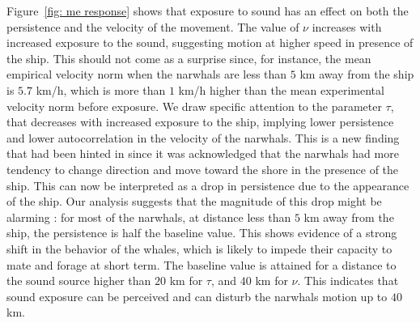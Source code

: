 \documentclass[11pt]{article}
\newcommand {\1}{\mathbb{1}}
\theoremstyle{definition}
\theoremstyle{remark}
\theoremstyle{remark}
\begin{document}
Figure~\ref{fig: me response} shows that exposure to sound has an effect on both the persistence and the velocity of the movement. The value of $\nu$ increases with increased exposure to the sound, suggesting motion at higher speed in presence of the ship. This should not come as a surprise since, for instance, the mean empirical velocity norm when the narwhals are less than $5$ km away from the ship is $5.7$ km/h, which is more than $1$ km/h higher than the mean experimental velocity norm before exposure. We draw specific attention to the parameter $\tau$, that decreases with increased exposure to the ship, implying lower persistence and lower autocorrelation in the velocity of the narwhals. This is a new finding that had been hinted in \cite{heide-jorgensen_behavioral_2021} since it was acknowledged that the narwhals had more tendency to change direction and move toward the shore in the presence of the ship. This can now be interpreted as a drop in persistence due to the appearance of the ship. Our analysis suggests that the magnitude of this drop might be alarming : for most of the narwhals, at distance less than $5$ km away from the ship, the persistence is half the baseline value. This shows evidence of a strong shift in the behavior of the whales, which is likely to impede their capacity to mate and forage at short term.
The baseline value is attained for a distance to the sound source higher than $20$ km for $\tau$, and  $40$ km for $\nu$. This indicates that sound exposure can be perceived and can disturb the narwhals motion up to $40$ km.
 
\end{document}
